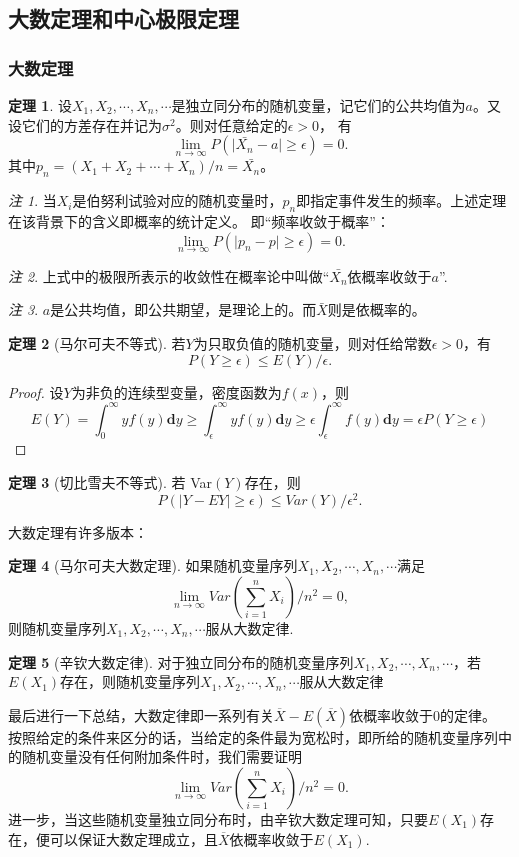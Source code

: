 \documentclass[a4paper,11pt]{article}%
\theoremstyle{remark}
\newtheorem*{remark}{注}
\theoremstyle{remark}
\theoremstyle{definition}
\newtheorem{theorem}{定理}[section]
\theoremstyle{definition}
\theoremstyle{plain}
\newcommand*{\abs}[1]{\lvert #1 \rvert}
\begin{document}
\subsection{大数定理和中心极限定理}
\subsubsection{大数定理}
\begin{theorem}
     设$X_1,X_2,\cdots,X_n,\cdots$是独立同分布的随机变量，记它们的公共均值为$a$。又设它们的方差存在并记为$\sigma^2$。则对任意给定的$\epsilon>0$，
    有
    \[\lim_{n\rightarrow\infty}P(\abs{\bar{X_n}-a}\geq\epsilon)=0.\]
    其中$p_n=(X_1+X_2+\cdots+X_n)/n=\bar{X_n}$。
\end{theorem}
\begin{remark}
    当$X_i$是伯努利试验对应的随机变量时，$p_n$即指定事件发生的频率。上述定理在该背景下的含义即概率的统计定义。
    即“频率收敛于概率”：
    \[\lim_{n\rightarrow\infty}P(\abs{p_n-p}\geq \epsilon)=0.\]
\end{remark}
\begin{remark}
    上式中的极限所表示的收敛性在概率论中叫做“$\bar{X_n}$依概率收敛于$a$”.
\end{remark}
\begin{remark}$a$是公共均值，即公共期望，是理论上的。而$\bar{X}$则是依概率的。
\end{remark}
\begin{theorem}[马尔可夫不等式]
    若$Y$为只取负值的随机变量，则对任给常数$\epsilon>0$，有 
    \[P(Y\geq\epsilon)\leq E(Y)/\epsilon.\]
    \begin{proof}
        设$Y$为非负的连续型变量，密度函数为$f(x)$，则 
        \[E(Y)=\int_{0}^{\infty}yf(y)\mathbf{d}y\geq \int_{\epsilon}^{\infty}yf(y)\mathbf{d}y\geq\epsilon\int_{\epsilon}^{\infty}f(y)\mathbf{d}y=\epsilon P(Y\geq \epsilon)\]
    \end{proof}
\end{theorem}
\begin{theorem}[切比雪夫不等式]
   若 Var$(Y)$存在，则
   \[P(\abs{Y-EY}\geq\epsilon)\leq Var(Y)/\epsilon^2.\] 
\end{theorem}
大数定理有许多版本：
\begin{theorem}[马尔可夫大数定理]
如果随机变量序列$X_1,X_2,\cdots,X_n,\cdots$满足
\[\lim_{n\rightarrow\infty}Var(\sum_{i=1}^{n}X_i)/n^2=0,\] 
则随机变量序列$X_1,X_2,\cdots,X_n,\cdots$服从大数定律.
\end{theorem}
\begin{theorem}[辛钦大数定律]
   对于独立同分布的随机变量序列$X_1,X_2,\cdots,X_n,\cdots$，若$E(X_1)$存在，则随机变量序列$X_1,X_2,\cdots,X_n,\cdots$服从大数定律 
\end{theorem}
最后进行一下总结，大数定律即一系列有关$\overline{X}-E(\overline{X})$依概率收敛于0的定律。
按照给定的条件来区分的话，当给定的条件最为宽松时，即所给的随机变量序列中的随机变量没有任何附加条件时，我们需要证明
\[\lim_{n\rightarrow\infty}Var(\sum_{i=1}^{n}X_i)/n^2=0.\]进一步，当这些随机变量独立同分布时，由辛钦大数定理可知，只要$E(X_1)$存在，便可以保证大数定理成立，且$\overline{X}$依概率收敛于$E(X_1)$.
\end{document}
